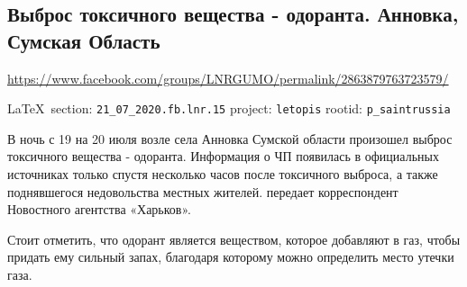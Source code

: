  
 
\subsection{Выброс токсичного вещества - одоранта. Анновка, Сумская Область}
\label{sec:21_07_2020.fb.lnr.15}
\url{https://www.facebook.com/groups/LNRGUMO/permalink/2863879763723579/}
  
\vspace{0.5cm}
{\small\LaTeX~section: \verb|21_07_2020.fb.lnr.15| project: \verb|letopis| rootid: \verb|p_saintrussia|}
\vspace{0.5cm}

В ночь с 19 на 20 июля возле села Анновка Сумской области произошел выброс
токсичного вещества - одоранта. Информация о ЧП появилась в официальных
источниках только спустя несколько часов после токсичного выброса, а также
поднявшегося недовольства местных жителей. передает корреспондент Новостного
агентства «Харьков».  

Стоит отметить, что одорант является веществом, которое
добавляют в газ, чтобы придать ему сильный запах, благодаря которому можно
определить место утечки газа.

  
